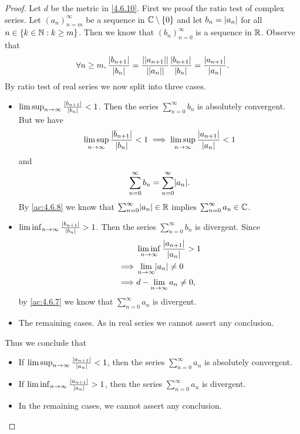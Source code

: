 \begin{proof}
  Let \(d\) be the metric in \cref{4.6.10}.
  First we proof the ratio test of complex series.
  Let \((a_n)_{n = m}^\infty\) be a sequence in \(\mathbb{C} \setminus \{0\}\) and let \(b_n = \left\lvert a_n\right\rvert\) for all \(n \in \{k \in \mathbb{N} : k \geq m\}\).
  Then we know that \((b_n)_{n = 0}^\infty\) is a sequence in \(\mathbb{R}\).
  Observe that
  \[
    \forall n \geq m, \frac{\left\lvert b_{n + 1}\right\rvert}{\left\lvert b_n\right\rvert} = \frac{\left\lvert\left\lvert a_{n + 1}\right\rvert\right\rvert}{\left\lvert\left\lvert a_n\right\rvert\right\rvert} \frac{\left\lvert b_{n + 1}\right\rvert}{\left\lvert b_n\right\rvert} = \frac{\left\lvert a_{n + 1}\right\rvert}{\left\lvert a_n\right\rvert}.
  \]
  By ratio test of real series we now split into three cases.
  \begin{itemize}
    \item \(\limsup_{n \to \infty} \frac{\left\lvert b_{n + 1}\right\rvert}{\left\lvert b_n\right\rvert} < 1\).
          Then the series \(\sum_{n = 0}^\infty b_n\) is absolutely convergent.
          But we have
          \[
            \limsup_{n \to \infty} \frac{\left\lvert b_{n + 1}\right\rvert}{\left\lvert b_n\right\rvert} < 1 \implies \limsup_{n \to \infty} \frac{\left\lvert a_{n + 1}\right\rvert}{\left\lvert a_n\right\rvert} < 1
          \]
          and
          \[
            \sum_{n = 0}^\infty b_n = \sum_{n = 0}^\infty \abs{a_n}.
          \]
          By \cref{ac:4.6.8} we know that \(\sum_{n = 0}^\infty \abs{a_n} \in \R\) implies \(\sum_{n = 0}^\infty a_n \in \mathbb{C}\).
    \item \(\liminf_{n \to \infty} \frac{\left\lvert b_{n + 1}\right\rvert}{\left\lvert b_n\right\rvert} > 1\).
          Then the series \(\sum_{n = 0}^\infty b_n\) is divergent.
          Since
          \begin{align*}
                     & \liminf_{n \to \infty} \frac{\abs{a_{n + 1}}}{\abs{a_n}} > 1 \\
            \implies & \lim_{n \to \infty} \abs{a_n} \neq 0                         \\
            \implies & d - \lim_{n \to \infty} a_n \neq 0,
          \end{align*}
          by \cref{ac:4.6.7} we know that \(\sum_{n = 0}^\infty a_n\) is divergent.
    \item The remaining cases.
          As in real series we cannot assert any conclusion.
  \end{itemize}
  Thus we conclude that
  \begin{itemize}
    \item If \(\limsup_{n \to \infty} \frac{\left\lvert a_{n + 1}\right\rvert}{\left\lvert a_n\right\rvert} < 1\), then the series \(\sum_{n = 0}^\infty a_n\) is absolutely convergent.
    \item If \(\liminf_{n \to \infty} \frac{\left\lvert a_{n + 1}\right\rvert}{\left\lvert a_n\right\rvert} > 1\), then the series \(\sum_{n = 0}^\infty a_n\) is divergent.
    \item In the remaining cases, we cannot assert any conclusion.
  \end{itemize}


\end{proof}
